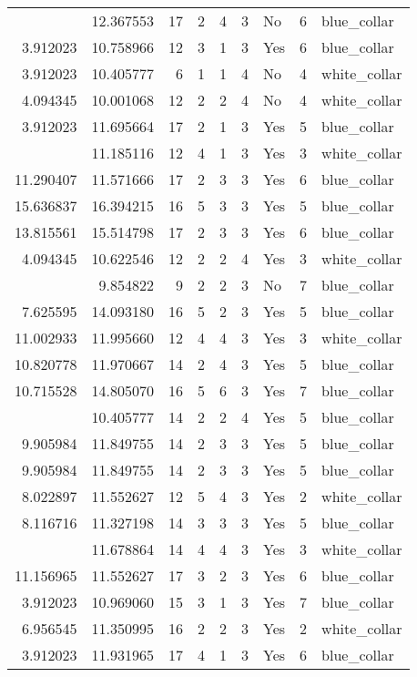 \documentclass[
]{article}
\begin{document}
\begin{longtable}[t]{rrrrrllrl}
\addlinespace
9.743906 & 12.367553 & 17 & 2 & 4 & 3 & No & 6 & blue\_collar\\
3.912023 & 10.758966 & 12 & 3 & 1 & 3 & Yes & 6 & blue\_collar\\
3.912023 & 10.405777 & 6 & 1 & 1 & 4 & No & 4 & white\_collar\\
4.094345 & 10.001068 & 12 & 2 & 2 & 4 & No & 4 & white\_collar\\
3.912023 & 11.695664 & 17 & 2 & 1 & 3 & Yes & 5 & blue\_collar\\
\addlinespace
3.912023 & 11.185116 & 12 & 4 & 1 & 3 & Yes & 3 & white\_collar\\
11.290407 & 11.571666 & 17 & 2 & 3 & 3 & Yes & 6 & blue\_collar\\
15.636837 & 16.394215 & 16 & 5 & 3 & 3 & Yes & 5 & blue\_collar\\
13.815561 & 15.514798 & 17 & 2 & 3 & 3 & Yes & 6 & blue\_collar\\
4.094345 & 10.622546 & 12 & 2 & 2 & 4 & Yes & 3 & white\_collar\\
\addlinespace
8.993427 & 9.854822 & 9 & 2 & 2 & 3 & No & 7 & blue\_collar\\
7.625595 & 14.093180 & 16 & 5 & 2 & 3 & Yes & 5 & blue\_collar\\
11.002933 & 11.995660 & 12 & 4 & 4 & 3 & Yes & 3 & white\_collar\\
10.820778 & 11.970667 & 14 & 2 & 4 & 3 & Yes & 5 & blue\_collar\\
10.715528 & 14.805070 & 16 & 5 & 6 & 3 & Yes & 7 & blue\_collar\\
\addlinespace
6.109248 & 10.405777 & 14 & 2 & 2 & 4 & Yes & 5 & blue\_collar\\
9.905984 & 11.849755 & 14 & 2 & 3 & 3 & Yes & 5 & blue\_collar\\
9.905984 & 11.849755 & 14 & 2 & 3 & 3 & Yes & 5 & blue\_collar\\
8.022897 & 11.552627 & 12 & 5 & 4 & 3 & Yes & 2 & white\_collar\\
8.116716 & 11.327198 & 14 & 3 & 3 & 3 & Yes & 5 & blue\_collar\\
\addlinespace
7.130899 & 11.678864 & 14 & 4 & 4 & 3 & Yes & 3 & white\_collar\\
11.156965 & 11.552627 & 17 & 3 & 2 & 3 & Yes & 6 & blue\_collar\\
3.912023 & 10.969060 & 15 & 3 & 1 & 3 & Yes & 7 & blue\_collar\\
6.956545 & 11.350995 & 16 & 2 & 2 & 3 & Yes & 2 & white\_collar\\
3.912023 & 11.931965 & 17 & 4 & 1 & 3 & Yes & 6 & blue\_collar\\

\end{longtable}
\end{document}
